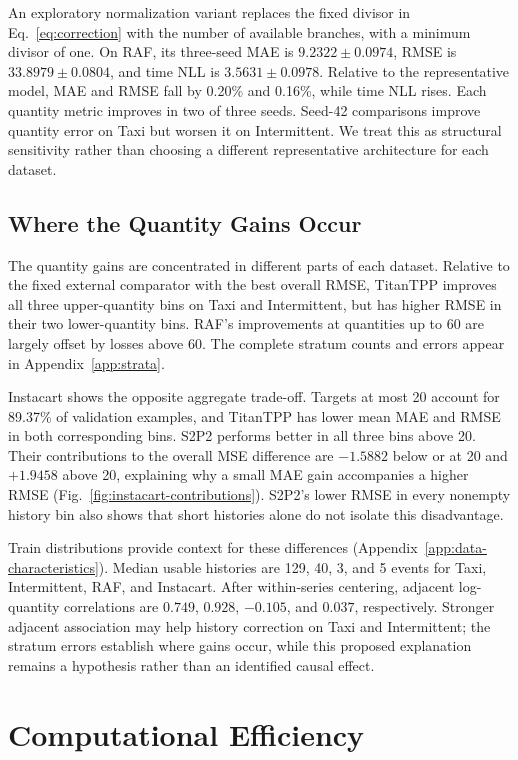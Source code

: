 \documentclass[runningheads]{llncs}
\begin{document}
An exploratory normalization variant replaces the fixed divisor in
Eq.~\eqref{eq:correction} with the number of available branches, with a
minimum divisor of one. On RAF, its three-seed MAE is $9.2322\pm0.0974$,
RMSE is $33.8979\pm0.0804$, and time NLL is $3.5631\pm0.0978$.
Relative to the representative model, MAE and RMSE fall by 0.20\% and
0.16\%, while time NLL rises. Each quantity metric improves in two of three
seeds. Seed-42 comparisons improve quantity error on Taxi but worsen it on
Intermittent. We treat this as structural sensitivity rather than choosing a
different representative architecture for each dataset.

\subsection{Where the Quantity Gains Occur}
The quantity gains are concentrated in different parts of each dataset.
Relative to the fixed external comparator with the best overall RMSE,
TitanTPP improves all three upper-quantity bins on Taxi and Intermittent,
but has higher RMSE in their two lower-quantity bins. RAF's improvements
at quantities up to 60 are largely offset by losses above 60. The complete
stratum counts and errors appear in Appendix~\ref{app:strata}.

Instacart shows the opposite aggregate trade-off. Targets at most 20 account
for 89.37\% of validation examples, and TitanTPP has lower mean MAE and RMSE
in both corresponding bins. S2P2 performs better in all three bins above 20.
Their contributions to the overall MSE difference are $-1.5882$ below or at
20 and $+1.9458$ above 20, explaining why a small MAE gain accompanies a
higher RMSE (Fig.~\ref{fig:instacart-contributions}). S2P2's lower RMSE
in every nonempty history bin also shows that short histories alone do not
isolate this disadvantage.

Train distributions provide context for these differences
(Appendix~\ref{app:data-characteristics}). Median usable histories are
129, 40, 3, and 5 events for Taxi, Intermittent, RAF, and Instacart.
After within-series centering, adjacent log-quantity correlations are
$0.749$, $0.928$, $-0.105$, and $0.037$, respectively. Stronger adjacent
association may help history correction on Taxi and Intermittent; the
stratum errors establish where gains occur, while this proposed explanation
remains a hypothesis rather than an identified causal effect.

\section{Computational Efficiency}
\end{document}
